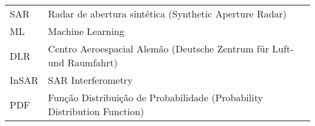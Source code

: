 \begin{longtable}{ll}
SAR	 & 		Radar de abertura sintética (Synthetic Aperture Radar)\\
ML	 & 		Machine Learning\\
DLR	 & 		Centro Aeroespacial Alemão (Deutsche Zentrum für Luft- und Raumfahrt)\\
InSAR	 & 		SAR Interferometry\\
PDF	 & 		Função Distribuição de Probabilidade (Probability Distribution Function)\\



\end{longtable}